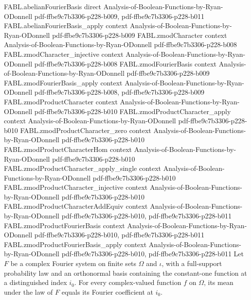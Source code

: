 \begin{theorem}
\proofstep
  {FABL.abelianFourierBasis}
  {direct}
  {Analysis-of-Boolean-Functions-by-Ryan-ODonnell}
  {pdf-ffbe9c7b3306-p228-b009,
    pdf-ffbe9c7b3306-p228-b011}
\proofstep
  {FABL.abelianFourierBasis_apply}
  {context}
  {Analysis-of-Boolean-Functions-by-Ryan-ODonnell}
  {pdf-ffbe9c7b3306-p228-b009}
\proofstep
  {FABL.zmodCharacter}
  {context}
  {Analysis-of-Boolean-Functions-by-Ryan-ODonnell}
  {pdf-ffbe9c7b3306-p228-b008}
\proofstep
  {FABL.zmodCharacter_injective}
  {context}
  {Analysis-of-Boolean-Functions-by-Ryan-ODonnell}
  {pdf-ffbe9c7b3306-p228-b008}
\proofstep
  {FABL.zmodFourierBasis}
  {context}
  {Analysis-of-Boolean-Functions-by-Ryan-ODonnell}
  {pdf-ffbe9c7b3306-p228-b009}
\proofstep
  {FABL.zmodFourierBasis_apply}
  {context}
  {Analysis-of-Boolean-Functions-by-Ryan-ODonnell}
  {pdf-ffbe9c7b3306-p228-b008,
    pdf-ffbe9c7b3306-p228-b009}
\proofstep
  {FABL.zmodProductCharacter}
  {context}
  {Analysis-of-Boolean-Functions-by-Ryan-ODonnell}
  {pdf-ffbe9c7b3306-p228-b010}
\proofstep
  {FABL.zmodProductCharacter_apply}
  {context}
  {Analysis-of-Boolean-Functions-by-Ryan-ODonnell}
  {pdf-ffbe9c7b3306-p228-b010}
\proofstep
  {FABL.zmodProductCharacter_zero}
  {context}
  {Analysis-of-Boolean-Functions-by-Ryan-ODonnell}
  {pdf-ffbe9c7b3306-p228-b010}
\proofstep
  {FABL.zmodProductCharacterHom}
  {context}
  {Analysis-of-Boolean-Functions-by-Ryan-ODonnell}
  {pdf-ffbe9c7b3306-p228-b010}
\proofstep
  {FABL.zmodProductCharacter_apply_single}
  {context}
  {Analysis-of-Boolean-Functions-by-Ryan-ODonnell}
  {pdf-ffbe9c7b3306-p228-b010}
\proofstep
  {FABL.zmodProductCharacter_injective}
  {context}
  {Analysis-of-Boolean-Functions-by-Ryan-ODonnell}
  {pdf-ffbe9c7b3306-p228-b010}
\proofstep
  {FABL.zmodProductCharacterAddEquiv}
  {context}
  {Analysis-of-Boolean-Functions-by-Ryan-ODonnell}
  {pdf-ffbe9c7b3306-p228-b010,
    pdf-ffbe9c7b3306-p228-b011}
\proofstep
  {FABL.zmodProductFourierBasis}
  {context}
  {Analysis-of-Boolean-Functions-by-Ryan-ODonnell}
  {pdf-ffbe9c7b3306-p228-b010,
    pdf-ffbe9c7b3306-p228-b011}
\proofstep
  {FABL.zmodProductFourierBasis_apply}
  {context}
  {Analysis-of-Boolean-Functions-by-Ryan-ODonnell}
  {pdf-ffbe9c7b3306-p228-b010,
    pdf-ffbe9c7b3306-p228-b011}
Let $F$ be a complex Fourier system on finite sets $Ω$ and $ι$, with a full-support
probability law and an orthonormal basis containing the constant-one function at a
distinguished index $i_0$. For every complex-valued function $f$ on $Ω$, its mean under
the law of $F$ equals its Fourier coefficient at $i_0$.
\end{theorem}

